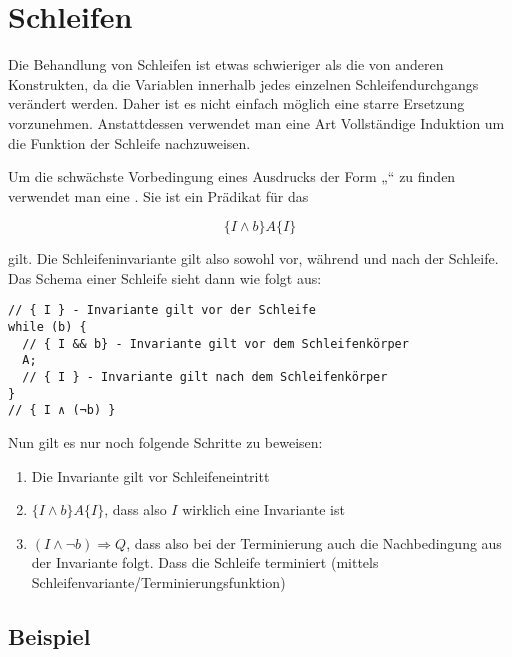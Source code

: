 \documentclass{lehramt-informatik-haupt}
\begin{document}
%

\section{Schleifen}

Die Behandlung von Schleifen ist etwas schwieriger als die von anderen
Konstrukten, da die Variablen innerhalb jedes einzelnen
Schleifendurchgangs verändert werden. Daher ist es nicht einfach möglich
eine starre Ersetzung vorzunehmen. Anstattdessen verwendet man eine Art
Vollständige Induktion um die Funktion der Schleife nachzuweisen.

Um die schwächste Vorbedingung eines Ausdrucks der Form „“ zu finden verwendet man eine . Sie
ist ein Prädikat für das

\begin{displaymath}
\{ I \wedge b \} A \{ I \}
\end{displaymath}

\noindent
gilt. Die Schleifeninvariante gilt also sowohl vor, während und nach der
Schleife. Das Schema einer Schleife sieht dann wie folgt aus:

\begin{verbatim}
// { I } - Invariante gilt vor der Schleife
while (b) {
  // { I && b} - Invariante gilt vor dem Schleifenkörper
  A;
  // { I } - Invariante gilt nach dem Schleifenkörper
}
// { I ∧ (¬b) }
\end{verbatim}

Nun gilt es nur noch folgende Schritte zu beweisen:

\begin{enumerate}
\item Die Invariante gilt vor Schleifeneintritt

\item $\{ I \wedge b \} A \{ I \}$, dass also $I$ wirklich eine
Invariante ist

\item $(I \wedge \neg b) \Rightarrow Q$, dass also bei der Terminierung
auch die Nachbedingung aus der Invariante folgt. Dass die Schleife
terminiert (mittels Schleifenvariante/Terminierungsfunktion)
\end{enumerate}

\subsection{Beispiel}
\end{document}
